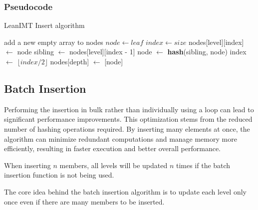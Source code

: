 \documentclass{article}
\begin{document}
\bigbreak

\subsubsection{Pseudocode}

\begin{algorithm}[H]
    \caption{LeanIMT Insert algorithm}\label{insert}
    \begin{algorithmic}[1]
         
        \State add a new empty array to nodes 
        \EndIf
        \State $node\gets leaf$
        \State $index\gets size$ 
        \State nodes[level][index] $\gets$ node
         
        \State sibling $\gets$ nodes[level][index - 1]
        \State node $\gets$ \textbf{hash}(sibling, node)
        \EndIf
        \State index $\gets$ $\lfloor index/2 \rfloor$ 
        \EndFor
        \State nodes[depth] $\gets$ [node] 
        \EndProcedure
    \end{algorithmic}
\end{algorithm}

\bigbreak

\subsection{Batch Insertion}

Performing the insertion in bulk rather than individually using a loop can lead to significant performance improvements. This optimization stems from the reduced number of hashing operations required. By inserting many elements at once, the algorithm can minimize redundant computations and manage memory more efficiently, resulting in faster execution and better overall performance.

\bigbreak

When inserting $n$ members, all levels will be updated $n$ times if the batch insertion function is not being used.

The core idea behind the batch insertion algorithm is to update each level only once even if there are many members to be inserted.
\end{document}
